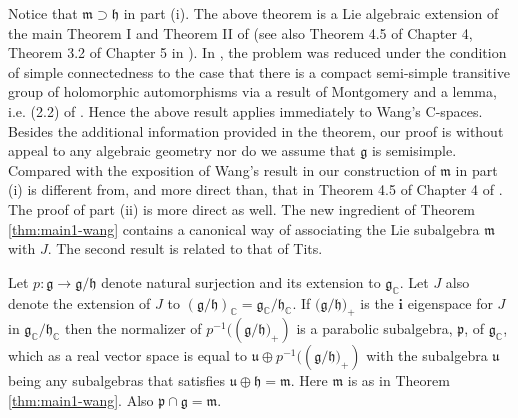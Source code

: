 \documentclass{amse-new}
\numberwithin{equation}{section} %
\begin{document}
Notice that $\mathfrak{m}\supset\mathfrak{h}$ in part (i). The above theorem
is a Lie algebraic extension of the main Theorem I and Theorem II of
\cite{Wang} (see also Theorem 4.5 of Chapter 4, Theorem 3.2 of Chapter 5 in
\cite{Mura}). In \cite{Wang}, the problem was reduced under the condition of
simple connectedness to the case that there is a compact semi-simple
transitive group of holomorphic automorphisms via a result of Montgomery
\cite{Monty} and a lemma, i.e. (2.2) of \cite{Wang}. Hence the above result
applies immediately to Wang's C-spaces. Besides the additional information provided in the
theorem, our proof is without appeal to any algebraic geometry nor do we
assume that $\mathfrak{g}$ is semisimple. Compared with the exposition of
Wang's result in \cite{Mura} our construction of $\mathfrak{m}$ in part (i) is
different from, and more direct than, that in Theorem 4.5 of Chapter 4 of
\cite{Mura}. The proof of part (ii) is more direct as well. The new ingredient
of Theorem \ref{thm:main1-wang} contains a canonical way of associating the
Lie subalgebra $\mathfrak{m}$ with $J$. The second result is related to that
of Tits.

\begin{theorem}
\label{thm:main2-tits} Let $p:\mathfrak{g}\rightarrow\mathfrak{\mathfrak{g}%
}/\mathfrak{h}$ denote natural surjection and its extension to $\mathfrak{g}%
_{\mathbb{C}}$. Let $J$ also denote the extension of $J$ to $\left(
\mathfrak{\mathfrak{g}}/\mathfrak{h}\right)  _{\mathbb{C}}%
=\mathfrak{\mathfrak{g}}_{\mathbb{C}}/\mathfrak{h}_{\mathbb{C}}$. If
$(\mathfrak{g}/\mathfrak{h)}_{+}$ is the $\mathbf{{i}}$ eigenspace for $J$ in
$\mathfrak{g}_{\mathbb{C}}/\mathfrak{h}_{\mathbb{C}}$ then the normalizer of $p^{-1}((\mathfrak{g}%
/\mathfrak{h)}_{+})$ is a parabolic subalgebra, $\mathfrak{p}$, of
$\mathfrak{g}_{\mathbb{C}}$, which as a real vector space is equal to
$\mathfrak{u}\oplus p^{-1}((\mathfrak{g}/\mathfrak{h)}_{+})$ with the
subalgebra $\mathfrak{u}$ being any subalgebras that satisfies $\mathfrak{u}%
\oplus\mathfrak{\mathfrak{h}}=\mathfrak{m}$. Here $\mathfrak{m}$ is as in
Theorem \ref{thm:main1-wang}. Also $\mathfrak{p}\cap\mathfrak{\mathfrak{g}%
}=\mathfrak{m}$.
\end{theorem}
\end{document}
